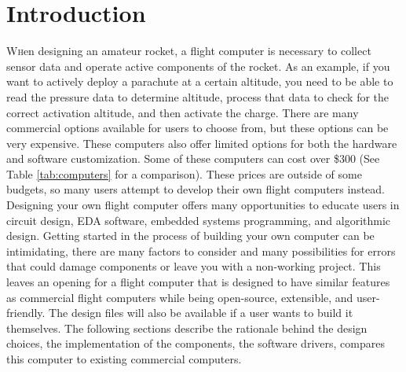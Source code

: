 \documentclass[conf]{new-aiaa}
\begin{document}
\section{Introduction}
\lettrine{W}hen designing an amateur rocket, a flight computer is necessary to collect sensor data and operate active components of the rocket. As an example, if you want to actively deploy a parachute at a certain altitude, you need to be able to read the pressure data to determine altitude, process that data to check for the correct activation altitude, and then activate the charge. There are many commercial options available for users to choose from, but these options can be very expensive. These computers also offer limited options for both the hardware and software customization. Some of these computers can cost over \$300 (See Table \ref{tab:computers} for a comparison). These prices are outside of some budgets, so many users attempt to develop their own flight computers instead. Designing your own flight computer offers many opportunities to educate users in circuit design, EDA software, embedded systems programming, and algorithmic design. Getting started in the process of building your own computer can be intimidating, there are many factors to consider and many possibilities for errors that could damage components or leave you with a non-working project. This leaves an opening for a flight computer that is designed to have similar features as commercial flight computers while being open-source, extensible, and user-friendly. The design files will also be available if a user wants to build it themselves. The following sections describe the rationale behind the design choices, the implementation of the components, the software drivers, compares this computer to existing commercial computers.
\end{document}
